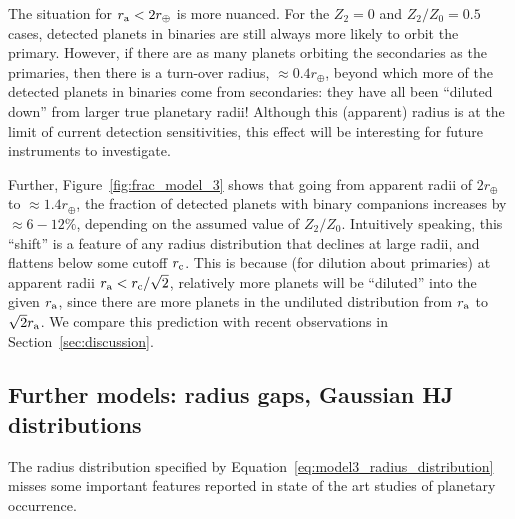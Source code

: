 \documentclass[12pt,modern]{aastex61}
\renewcommand{\a}{_{\rm a}}
\begin{document}
The situation for $r\a < 2r_\oplus$ is more nuanced.  For the $Z_2=0$
and $Z_2/Z_0=0.5$ cases, detected planets in binaries are still always
more likely to orbit the primary.  However, if there are as many
planets orbiting the secondaries as the primaries, then there is a
turn-over radius, $\approx 0.4r_\oplus$, beyond which more of the
detected planets in binaries come from secondaries: they have all been
``diluted down'' from larger true planetary radii!  Although this
(apparent) radius is at the limit of current detection sensitivities,
this effect will be interesting for future instruments to investigate.

Further, Figure~\ref{fig:frac_model_3} shows that going from apparent
radii of $2r_\oplus$ to $\approx 1.4r_\oplus$, the fraction of
detected planets with binary companions increases by $\approx 6-12\%$,
depending on the assumed value of $Z_2/Z_0$. %
Intuitively speaking, this ``shift'' is a feature of any radius
distribution that declines at large radii, and flattens below some
cutoff $r_{\rm c}$.  This is because (for dilution about primaries) at
apparent radii $r\a < r_{\rm c}/\sqrt{2}$, relatively more planets
will be ``diluted'' into the given $r\a$, since there are more planets
in the undiluted distribution from $r\a$ to $\sqrt{2}r\a$.  We compare
this prediction with recent observations in
Section~\ref{sec:discussion}.



\subsection{Further models: radius gaps, Gaussian HJ distributions}
\label{sec:further_models}

The radius distribution specified by
Equation~\ref{eq:model3_radius_distribution} misses some important
features reported in state of the art studies of planetary occurrence.
\end{document}
